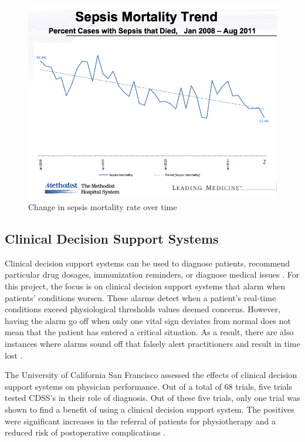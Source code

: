 \documentclass{sig-alternate}
\begin{document}
\begin{figure}
	\begin{center}
		\includegraphics[width=1.0\linewidth]{methodist2.png}
	\end{center}
	\caption{Change in sepsis mortality rate over time}
	\label{fig:mortality_rate_time}
\end{figure}


\vspace{10pt}
\subsection{Clinical Decision Support Systems}
\label{subsec:cdss}
\vspace{10pt}

Clinical decision support systems can be used to diagnose patients, recommend particular drug dosages, immunization reminders, or diagnose medical issues \cite{cdss}. For this project, the focus is on clinical decision support systems that alarm when patients' conditions worsen. These alarms detect when a patient's real-time conditions exceed physiological thresholds values deemed concerns. However, having the alarm go off when only one vital sign deviates from normal does not mean that the patient has entered a critical situation. As a result, there are also instances where alarms sound off that falsely alert practitioners and result in time lost \cite{deaths}.

The University of California San Francisco assessed the effects of clinical decision support systems on physician performance. Out of a total of 68 trials, five trials tested CDSS's in their role of diagnosis. Out of these five trials, only one trial was shown to find a benefit of using a clinical decision support system. The positives were significant increases in the referral of patients for physiotherapy and a reduced risk of postoperative complications \cite{cdss}. 
\end{document}
